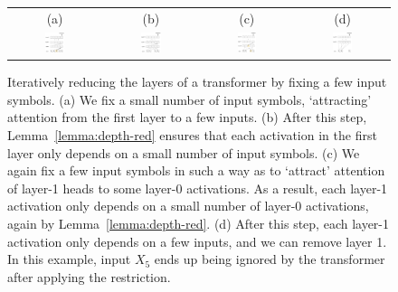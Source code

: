 \documentclass[11pt,a4paper]{article}
\begin{document}






\begin{figure}[ht]
    \centering
    \begin{tabular}{cccc}
    (a) & (b) & (c) & (d) \\
    \includegraphics[width=0.23\textwidth]{figures/sa1.png} &
        \includegraphics[width=0.23\textwidth]{figures/sa2.png}&
    \includegraphics[width=0.22\textwidth]{figures/sa3.png} &
        \includegraphics[width=0.23\textwidth]{figures/sa4.png}
        \end{tabular}
	\caption{Iteratively reducing the layers of a transformer by fixing a few input symbols. (a) We fix a small number of input symbols, `attracting' attention from the first layer to a few inputs. (b) After this step, Lemma~\ref{lemma:depth-red} ensures that each activation in the first layer only depends on a small number of input symbols. (c) We again fix a few input symbols in such a way as to `attract' attention of layer-1 heads to some layer-0 activations. As a result, each layer-1 activation only depends on a small number of layer-0 activations, again by Lemma~\ref{lemma:depth-red}. (d) After this step, each layer-1 activation only depends on a few inputs, and we can remove layer 1. In this example, input $X_5$ ends up being ignored by the transformer after applying the restriction.}

\end{figure}
\end{document}
